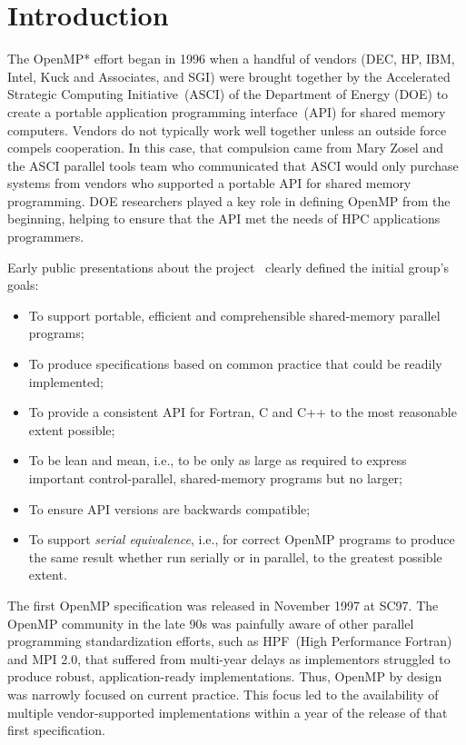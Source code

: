 \section{Introduction}
\label{sec:intro}

The OpenMP* effort began in 1996 when a handful of vendors (DEC, HP, IBM, 
Intel, Kuck and Associates, and SGI) were brought together by the Accelerated 
Strategic Computing Initiative~(ASCI) of the Department of Energy (DOE) to 
create a portable application programming interface~(API) for shared memory 
computers. Vendors do not typically work well together unless an outside 
force compels cooperation. In this case, that compulsion came from Mary 
Zosel and the ASCI parallel tools team who communicated that ASCI would 
only purchase systems from vendors who supported a portable API for shared 
memory programming. DOE researchers played a key role in defining OpenMP 
from the beginning, helping to ensure that the API met the needs of HPC 
applications programmers.

Early public presentations about the project~\cite{ewomp99} clearly
defined the initial group's goals:

\begin{itemize}
  \item To support portable, efficient and comprehensible shared-memory 
        parallel programs;
  \item To produce specifications based on common practice that 
        could be readily implemented;
  \item To provide a consistent API for Fortran, C and C++ to the 
        most reasonable extent possible;
  \item To be lean and mean, i.e., to  be only as large as required 
        to express important control-parallel, shared-memory programs  
        but no larger;
  \item To ensure API versions are backwards compatible;
  \item To support \emph{serial equivalence}, i.e., for correct OpenMP 
        programs to produce the same result whether run serially or in
        parallel, to the greatest possible extent.
\end{itemize}

The first OpenMP specification  was released in November 1997 at SC97. The
OpenMP community in the late 90s was painfully aware of other parallel
programming  standardization efforts, such as HPF~(High Performance Fortran) and MPI 2.0, that
suffered from multi-year delays as implementors struggled to produce robust,
application-ready implementations. Thus, OpenMP by design was narrowly
focused on current practice. This focus led to the availability of multiple
vendor-supported implementations within a year of the release of that 
first specification. 

